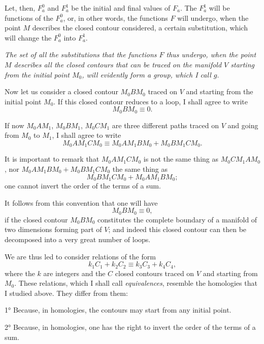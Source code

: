 \documentclass{article}
\begin{document}
Let, then, $F^{0}_{a}$ and $F^{1}_{a}$ be the initial and final values of $F_{a}$. The $F^{1}_{a}$ will be functions of the $F^{0}_{a}$, or, in other words, the functions $F$ will undergo, when the point $M$ describes the closed contour considered, a certain substitution, which will change the $F^{0}_{a}$ into $F^{1}_{a}$.

\emph{The set of all the substitutions that the functions $F$ thus undergo, when the point $M$ describes all the closed contours that can be traced on the manifold $V$ starting from the initial point $M_{0}$, will evidently form a group, which I call $g$}.

Now let us consider a closed contour $M_{0}BM_{0}$ traced on $V$ and starting from the initial point $M_{0}$. If this closed contour reduces to a loop, I shall agree to write
\[ M_{0}BM_{0} \equiv 0. \]

If now $M_{0}AM_{1}$, $M_{0}BM_{1}$, $M_{0}CM_{1}$ are three different paths traced on $V$ and going from $M_{0}$ to $M_{1}$, I shall agree to write
\[ M_{0}AM_{1}CM_{0} \equiv M_{0}AM_{1}BM_{0} + M_{0}BM_{1}CM_{0}. \]

It is important to remark that $M_{0}AM_{1}CM_{0}$ is not the same thing as $M_{0}CM_{1}AM_{0}$, nor $M_{0}AM_{1}BM_{0} + M_{0}BM_{1}CM_{0}$ the same thing as
\[ M_{0}BM_{1}CM_{0} + M_{0}AM_{1}BM_{0}; \]
one cannot invert the order of the terms of a sum.

It follows from this convention that one will have
\[ M_{0}BM_{0} \equiv 0, \]
if the closed contour $M_{0}BM_{0}$ constitutes the complete boundary of a manifold of two dimensions forming part of $V$; and indeed this closed contour can then be decomposed into a very great number of loops.

We are thus led to consider relations of the form
\[ k_{1}C_{1} + k_{2}C_{2} \equiv k_{3}C_{3} + k_{4}C_{4}, \]
where the $k$ are integers and the $C$ closed contours traced on $V$ and starting from $M_{0}$. These relations, which I shall call \emph{equivalences}, resemble the homologies that I studied above. They differ from them:

1° Because, in homologies, the contours may start from any initial point.

2° Because, in homologies, one has the right to invert the order of the terms of a sum.
\end{document}

